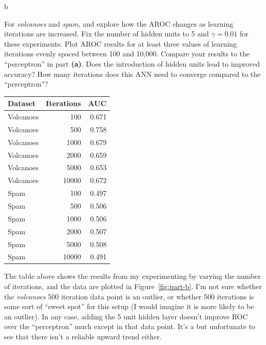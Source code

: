 \documentclass[fleqn]{homework}
\begin{document}
  \begin{problem}{b}
    \begin{question}
      For \textit{volcanoes} and \textit{spam}, and explore how the AROC changes
      as learning iterations are increased. Fix the number of hidden units to 5
      and $\gamma = 0.01$ for these experiments. Plot AROC results for at least
      three values of learning iterations evenly spaced between 100 and
      10,000. Compare your results to the “perceptron” in part
      \textbf{(a)}. Does the introduction of hidden units lead to improved
      accuracy? How many iterations does this ANN need to converge compared to
      the “perceptron”?
    \end{question}

    \begin{tabular}{|lrr|}
      \hline
      Dataset & Iterations & AUC \\
      \hline
      Volcanoes & 100 & 0.671 \\
      Volcanoes & 500 & 0.758 \\
      Volcanoes & 1000 & 0.679 \\
      Volcanoes & 2000 & 0.659 \\
      Volcanoes & 5000 & 0.653 \\
      Volcanoes & 10000 & 0.672 \\
      Spam & 100 & 0.497 \\
      Spam & 500 & 0.506 \\
      Spam & 1000 & 0.506 \\
      Spam & 2000 & 0.507 \\
      Spam & 5000 & 0.508 \\
      Spam & 10000 & 0.491 \\
      \hline
    \end{tabular}

    The table above shows the results from my experimenting by varying the
    number of iterations, and the data are plotted in Figure~\ref{fig:part-b}.
    I'm not sure whether the \textit{volcanoes} 500 iteration data point is an
    outlier, or whether 500 iterations is some sort of ``sweet spot'' for this
    setup (I would imagine it is more likely to be an outlier).  In any case,
    adding the 5 unit hidden layer doesn't improve ROC over the ``perceptron''
    much except in that data point.  It's a but unfortunate to see that there
    isn't a reliable upward trend either.


\end{problem}
\end{document}
